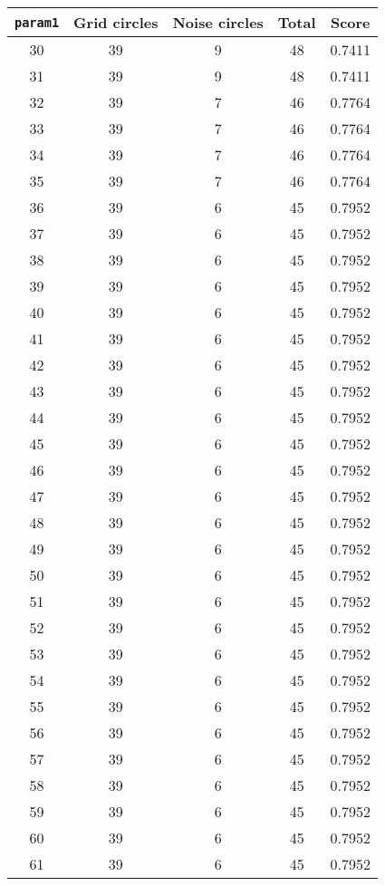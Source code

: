 \documentclass[letterpaper, 12pt]{article}
\begin{document}
\begin{longtable}{|c|c|c|c|c|}
\hline
\textbf{\texttt{param1}} & \textbf{Grid circles} & \textbf{Noise circles} & \textbf{Total} & \textbf{Score} \\
\hline
30 & 39 & 9 & 48 & 0.7411 \\
\hline
31 & 39 & 9 & 48 & 0.7411 \\
\hline
32 & 39 & 7 & 46 & 0.7764 \\
\hline
33 & 39 & 7 & 46 & 0.7764 \\
\hline
34 & 39 & 7 & 46 & 0.7764 \\
\hline
35 & 39 & 7 & 46 & 0.7764 \\
\hline
36 & 39 & 6 & 45 & 0.7952 \\
\hline
37 & 39 & 6 & 45 & 0.7952 \\
\hline
38 & 39 & 6 & 45 & 0.7952 \\
\hline
39 & 39 & 6 & 45 & 0.7952 \\
\hline
40 & 39 & 6 & 45 & 0.7952 \\
\hline
41 & 39 & 6 & 45 & 0.7952 \\
\hline
42 & 39 & 6 & 45 & 0.7952 \\
\hline
43 & 39 & 6 & 45 & 0.7952 \\
\hline
44 & 39 & 6 & 45 & 0.7952 \\
\hline
45 & 39 & 6 & 45 & 0.7952 \\
\hline
46 & 39 & 6 & 45 & 0.7952 \\
\hline
47 & 39 & 6 & 45 & 0.7952 \\
\hline
48 & 39 & 6 & 45 & 0.7952 \\
\hline
49 & 39 & 6 & 45 & 0.7952 \\
\hline
50 & 39 & 6 & 45 & 0.7952 \\
\hline
51 & 39 & 6 & 45 & 0.7952 \\
\hline
52 & 39 & 6 & 45 & 0.7952 \\
\hline
53 & 39 & 6 & 45 & 0.7952 \\
\hline
54 & 39 & 6 & 45 & 0.7952 \\
\hline
55 & 39 & 6 & 45 & 0.7952 \\
\hline
56 & 39 & 6 & 45 & 0.7952 \\
\hline
57 & 39 & 6 & 45 & 0.7952 \\
\hline
58 & 39 & 6 & 45 & 0.7952 \\
\hline
59 & 39 & 6 & 45 & 0.7952 \\
\hline
60 & 39 & 6 & 45 & 0.7952 \\
\hline
61 & 39 & 6 & 45 & 0.7952 \\

\end{longtable}
\end{document}
